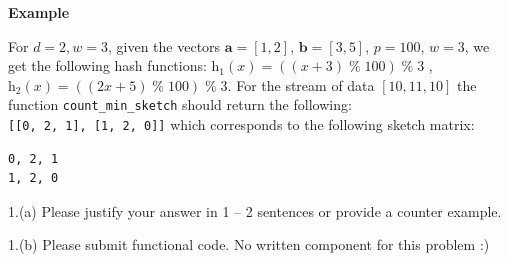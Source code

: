 \documentclass{hw}
\begin{document}
\begin{problem}
\begin{subproblem}
\textbf{Example}

For $d=2, w=3$, given the vectors $\mathbf{a} = [1, 2]$, $\mathbf{b} = [3, 5]$, $p=100$, $w=3$, we get the following hash functions: $\text{h}_1(x) = ((x + 3) \; \% \; 100)\; \% \; 3$ , $\text{h}_2(x) = ((2x + 5) \; \% \; 100)\; \% \; 3$. For the stream of data $[10, 11, 10]$ the function \texttt{count\_min\_sketch} should return the following:\\
\texttt{[[0, 2, 1], [1, 2, 0]]} which corresponds to the following sketch matrix:
\begin{lstlisting}
0, 2, 1
1, 2, 0
\end{lstlisting}

\end{subproblem}


\end{problem}


\begin{solution}
1.(a) Please justify your answer in 1 – 2 sentences or provide a counter example.
\end{solution}

\begin{solution}
1.(b) Please submit functional code. No written component for this problem :)
\end{solution}






\end{document}
